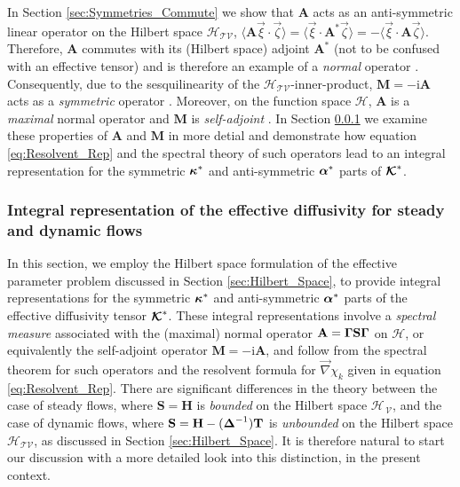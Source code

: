 \documentclass[11pt]{amsart}
\newcommand{\I}{\mathrm{i}}
\newcommand{\Mb}{\mathbf{M}}
\newcommand{\Tb}{\mathbf{T}}
\newcommand{\Hb}{\mathbf{H}}
\newcommand{\Sb}{\mathbf{S}}
\newcommand{\Ab}{\mathbf{A}}
\newcommand\Kbc{\mbox{\boldmath${\mathcal{K}}$}}
\newcommand{\Tc}{\mathcal{T}}
\newcommand{\Vc}{\mathcal{V}}
\newcommand{\Hs}{\mathscr{H}}
\newcommand\balpha{\mbox{\boldmath${\alpha}$}}
\newcommand\bDelta{\mbox{\boldmath${\Delta}$}}
\newcommand\bkappa{\mbox{\boldmath${\kappa}$}}
\newcommand\bGamma{\mbox{\boldmath${\Gamma}$}}
\begin{document}
In Section \ref{sec:Symmetries_Commute} we show that $\Ab$ acts as an
anti-symmetric linear operator on the Hilbert space $\Hs_{\Tc\Vc}$,
$\langle\Ab\vec{\xi}\cdot\vec{\zeta}\rangle=\langle\vec{\xi}\cdot\Ab^*\vec{\zeta}\rangle=-\langle\vec{\xi}\cdot\Ab\vec{\zeta}\rangle$. Therefore,
$\Ab$ commutes with its (Hilbert space) adjoint $\Ab^*$ (not to be
confused with an effective tensor) and is
therefore an example of a \emph{normal} operator
\cite{Stone:64}. Consequently, due to the sesquilinearity of the    
$\Hs_{\Tc\Vc}$-inner-product, $\Mb=-\I\Ab$ acts as a \emph{symmetric}
operator \cite{Reed-1980,Stone:64}. Moreover, on the function space 
$\Hs$, $\Ab$ is a \emph{maximal} normal operator and
$\Mb$ is \emph{self-adjoint} \cite{Stone:64}. In Section
\ref{sec:Integral_Rep} we examine these properties of $\Ab$ and $\Mb$ 
in more detial and demonstrate how equation \eqref{eq:Resolvent_Rep}
and the spectral theory of such operators lead to an integral
representation for the symmetric $\bkappa^*$ and anti-symmetric
$\balpha^*$ parts of $\Kbc^*$.      








\subsubsection{Integral representation of the effective diffusivity
  for steady and dynamic flows}\label{sec:Integral_Rep}
%
In this section, we employ the Hilbert space formulation of the
effective parameter problem discussed in Section
\ref{sec:Hilbert_Space}, to provide integral representations for the
symmetric $\bkappa^*$ and anti-symmetric $\balpha^*$ parts of the
effective diffusivity tensor $\Kbc^*$. These integral representations
involve a \emph{spectral measure} associated with the 
(maximal) normal operator $\Ab=\bGamma\Sb\bGamma$ on
$\Hs$, or equivalently the self-adjoint operator
$\Mb=-\I\Ab$, and follow from the spectral theorem for such operators
\cite{Reed-1980,Stone:64} and the resolvent formula for $\vec{\nabla}\chi_k$
given in equation \eqref{eq:Resolvent_Rep}. There 
are significant differences in the theory between the case of steady 
flows, where $\Sb=\Hb$ is \emph{bounded} on the Hilbert space
$\Hs_{\,\Vc}$, and the case of dynamic flows, where
$\Sb=\Hb-(\bDelta^{-1})\Tb$ is \emph{unbounded} on the Hilbert space
$\Hs_{\Tc\Vc}$, as discussed in Section \ref{sec:Hilbert_Space}. It is
therefore natural to start our discussion with a more detailed look
into this distinction, in the present context.       
\end{document}

